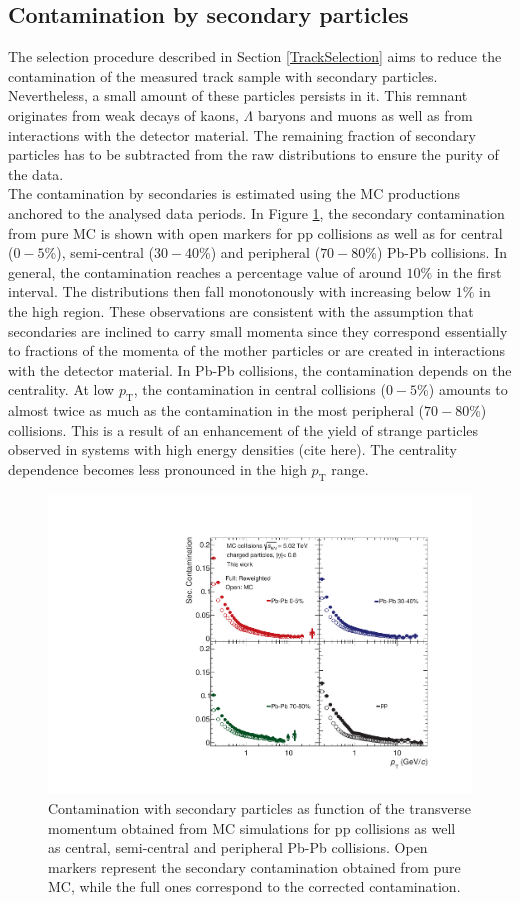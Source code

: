 \documentclass[12pt,a4paper]{report}
\begin{document}
\subsection{Contamination by secondary particles}
The selection procedure described in Section \ref{TrackSelection} aims to reduce the contamination of the measured track sample with secondary particles. Nevertheless, a small amount of these particles persists in it. This remnant originates from weak decays of kaons, $\Lambda$ baryons and muons as well as from interactions with the detector material. The remaining fraction of secondary particles has to be subtracted from the raw \pt distributions to ensure the purity of the data.\\
The contamination by secondaries is estimated using the MC productions anchored to the analysed data periods. In Figure \ref{SecCont}, the secondary contamination from pure MC is shown with open markers for pp collisions as well as for central ($0-5$\%), semi-central ($30-40$\%) and peripheral ($70-80$\%) Pb-Pb collisions. In general, the contamination reaches a percentage value of around  $10\%$ in the first \pt interval. The distributions then fall monotonously with increasing \pt below $1\%$ in the high \pt region. These observations are consistent with the assumption that secondaries are inclined to carry small momenta since they correspond essentially to fractions of the momenta of the mother particles or are created in interactions with the detector material. In Pb-Pb collisions, the contamination depends on the centrality. At low $p_\text{T}$, the contamination in central collisions ($0-5$\%) amounts to almost twice as much as the contamination in the most peripheral ($70-80$\%) collisions. This is a result of an enhancement of the yield of strange particles observed in systems with high energy densities (cite here). The centrality dependence becomes less pronounced in the high $p_\text{T}$ range.
\begin{figure}[tb!]
\centering
\includegraphics[width=12cm]{Plots/secCont.pdf}  
\caption{Contamination with secondary particles as function of the transverse momentum obtained from MC simulations for pp collisions as well as central, semi-central and peripheral Pb-Pb collisions. Open markers represent the secondary contamination obtained from pure MC, while the full ones correspond to the  corrected contamination.}
\label{SecCont}
\end{figure}
\end{document}
